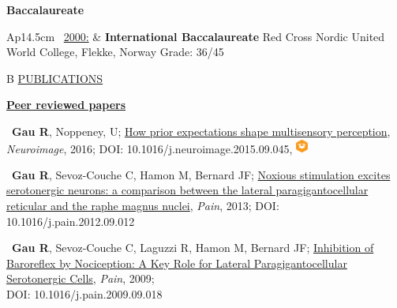 \documentclass[a4paper,12pt,oneside]{letter}
\begin{document}
{\begin{center}
 \large\textbf{Baccalaureate}
\end{center}

\begin{tabular}{Ap{14.5cm}}
\textbullet~\underline{2000:} & \large\textbf{International Baccalaureate} \newline
				\normalsize Red Cross Nordic United World College, Flekke, Norway \newline
				Grade: 36/45 \\
\end{tabular}


\medskip 

\begin{tabular}{B}
 \underline{PUBLICATIONS}
\end{tabular}


\begin{center}
  \href{https://osf.io/4h63t/}{\large\textbf{Peer reviewed papers}}
\end{center}

\textbullet~\textbf{Gau R}, Noppeney, U; 
\href{http://www.sciencedirect.com/science/article/pii/S1053811915008605}{How prior expectations shape multisensory perception}, \textit{Neuroimage}, 2016; DOI: 10.1016/j.neuroimage.2015.09.045,  \href{https://github.com/Remi-Gau/McGurk_prior_code}{\includegraphics[width=0.4cm]{materials_small_color.png}}

\textbullet~\textbf{Gau R}, Sevoz-Couche C, Hamon M, Bernard JF; 
\href{http://www.researchgate.net/profile/Remi_Gau/publication/233394350_Noxious_stimulation_excites_serotonergic_neurons_A_comparison_between_the_lateral_paragigantocellular_reticular_and_the_raphe_magnus_nuclei/links/586bf62508aebf17d3a5b232.pdf}{Noxious stimulation excites serotonergic neurons: a comparison between the lateral paragigantocellular reticular and the raphe magnus nuclei}, \textit{Pain}, 2013; DOI: 10.1016/j.pain.2012.09.012

\textbullet~\textbf{Gau R}, Sevoz-Couche C, Laguzzi R, Hamon M, Bernard JF; \href{http://www.researchgate.net/profile/Remi_Gau/publication/38057329_Inhibition_of_cardiac_baroreflex_by_noxious_thermal_stimuli_A_key_role_for_lateral_paragigantocellular_serotonergic_cells/links/586bf90d08ae8fce4919e188.pdf}{Inhibition of Baroreflex by Nociception: A Key Role for Lateral Paragigantocellular Serotonergic Cells}, \textit{Pain}, 2009; \\DOI: 10.1016/j.pain.2009.09.018

}
\end{document}
